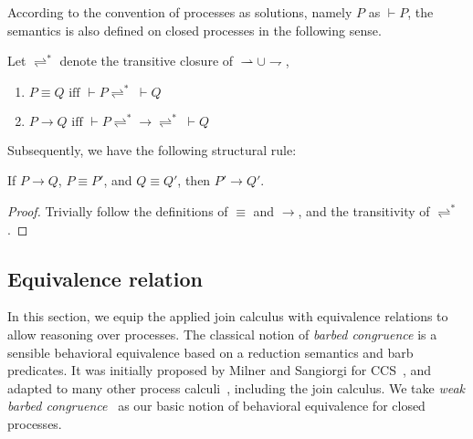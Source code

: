 \documentclass{LMCS}
\newcommand{\forget}[1]{}
\renewcommand{\_}{\mathord{\rule[-.25ex]{1ex}{.15ex}}}
\newcommand{\soup}[2]{#1\vdash#2}
\newcommand{\reduces}{\longrightarrow}
\newcommand{\hc}{\rightleftharpoons}
\begin{document}
According to the convention of processes as solutions, namely $P$ as
$\soup{}{P}$, the semantics is also defined on closed processes
in the following sense.
\begin{defi}
  Let $\hc^*$ denote the transitive closure of
  $\rightharpoonup\cup\rightharpoondown$, 
  \begin{enumerate}[(1)]
  \item $P \equiv Q \mbox{ iff } \soup{}{P} \hc^* \;\soup{}{Q}$
  \item $P \reduces Q \mbox{ iff } \soup{}{P} \hc^*\reduces\hc^*
    \;\soup{}{Q}$
  \end{enumerate}
\end{defi}
Subsequently, we have the following structural rule:
\begin{lem}\label{struct-rule}
  If $P\reduces Q$, $P\equiv P'$, and $Q\equiv Q'$, then $P'\reduces
  Q'$.
\end{lem}
\begin{proof}
  Trivially follow the definitions of $\equiv$ and $\reduces$, and the
  transitivity of $\hc^*$. \forget{\qed}
\end{proof}
\subsection{Equivalence relation}
\label{subsec.eq}

In this section, we equip the applied join calculus with equivalence
relations to allow reasoning over processes. The classical
notion of \emph{barbed congruence} is a sensible behavioral
equivalence based on a reduction semantics and barb predicates. It was
initially proposed by Milner and Sangiorgi for
CCS~\cite{Milner92barbed}, and adapted to many other process
calculi~\cite{Honda95reductionbased,Amadio96bisimulations}, including
the join calculus. We take \emph{weak
  barbed congruence}~\cite{Milner92barbed} as our basic notion of
behavioral equivalence for closed processes.
\end{document}
